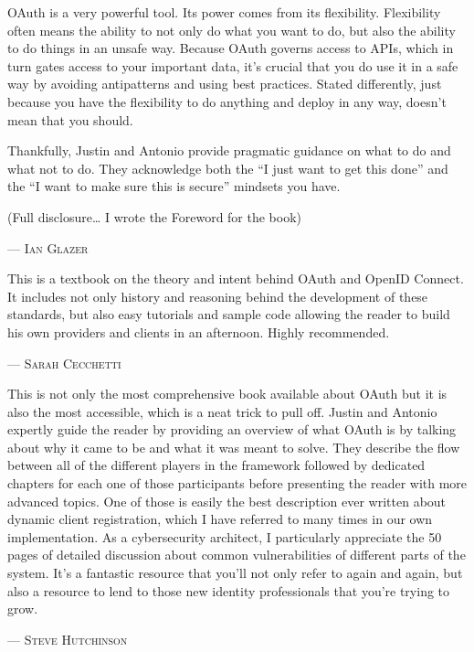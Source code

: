 OAuth is a very powerful tool. Its power comes from its flexibility. Flexibility often means the ability to not only do what you want to do, but also the ability to do things in an unsafe way. Because OAuth governs access to APIs, which in turn gates access to your important data, it’s crucial that you do use it in a safe way by avoiding antipatterns and using best practices. Stated differently, just because you have the flexibility to do anything and deploy in any way, doesn’t mean that you should.

Thankfully, Justin and Antonio provide pragmatic guidance on what to do and what not to do. They acknowledge both the “I just want to get this done” and the “I want to make sure this is secure” mindsets you have.

(Full disclosure… I wrote the Foreword for the book) 
\setlength{\parindent}{0cm}\par\textsc{ --- Ian Glazer }\par\vspace{12pt}\setlength{\parindent}{15pt}
This is a textbook on the theory and intent behind OAuth and OpenID Connect. It includes not only history and reasoning behind the development of these standards, but also easy tutorials and sample code allowing the reader to build his own providers and clients in an afternoon. Highly recommended. 
\setlength{\parindent}{0cm}\par\textsc{ --- Sarah Cecchetti }\par\vspace{12pt}\setlength{\parindent}{15pt}
This is not only the most comprehensive book available about OAuth but it is also the most accessible, which is a neat trick to pull off. Justin and Antonio expertly guide the reader by providing an overview of what OAuth is by talking about why it came to be and what it was meant to solve. They describe the flow between all of the different players in the framework followed by dedicated chapters for each one of those participants before presenting the reader with more advanced topics. One of those is easily the best description ever written about dynamic client registration, which I have referred to many times in our own implementation. As a cybersecurity architect, I particularly appreciate the 50 pages of detailed discussion about common vulnerabilities of different parts of the system. It’s a fantastic resource that you’ll not only refer to again and again, but also a resource to lend to those new identity professionals that you’re trying to grow. 
\setlength{\parindent}{0cm}\par\textsc{ --- Steve Hutchinson }\par\vspace{12pt}\setlength{\parindent}{15pt}
